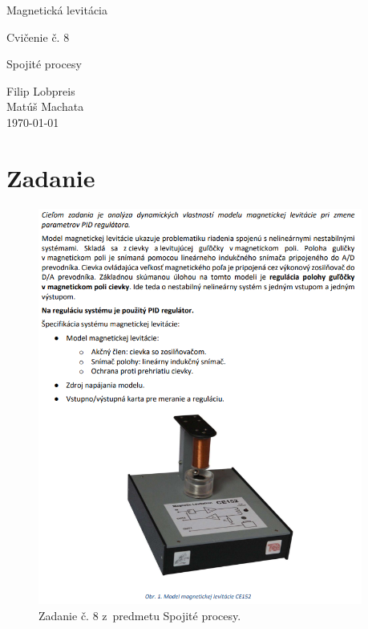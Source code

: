 \documentclass{article}
\begin{document}
\begin{titlepage}
	\null\vfill

	\begin{center}
		{\Huge Magnetická levitácia }
		\vskip 2cm

		{\Large Cvičenie č. 8}
		\vskip 0.5cm

		{\large Spojité procesy}
	\end{center}

	\vfill
	\vfill

	\begin{flushright}
		Filip Lobpreis \\
		Matúš Machata \\
		\small\today\\
	\end{flushright}
	\hfill
\end{titlepage}

\thispagestyle{empty}
\clearpage

\tableofcontents
\thispagestyle{empty}
\clearpage

\section{Zadanie}
\label{sec:zadanie}

\begin{figure}[!htbp]
	\begin{center}
		\includegraphics[width=0.95\textwidth]{include/zadanie.png}
	\end{center}
	\caption{Zadanie č. 8 z~predmetu Spojité procesy.}
	\label{fig:zadanie}
\end{figure}
\end{document}
